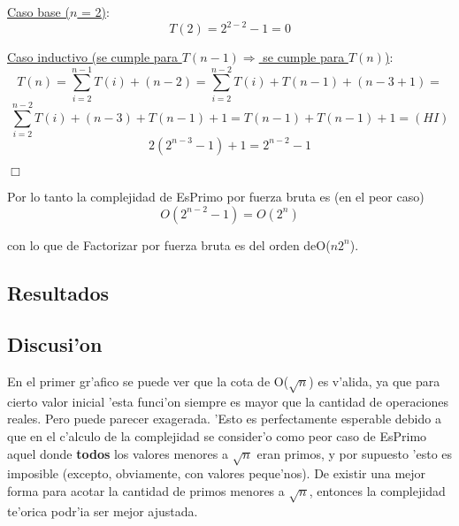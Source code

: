 \underline{Caso base ($n$ = 2)}:
$$T(2) = 2^{2-2} - 1 = 0$$

\underline{Caso inductivo (se cumple para $T(n-1) \Longrightarrow$ se cumple para $T(n)$)}:
$$T(n) = \sum_{i=2}^{n-1}{T(i)} + (n-2) = \sum_{i=2}^{n-2}{T(i)} + T(n-1) + (n-3+1) =$$
$$\sum_{i=2}^{n-2}{T(i)} + (n-3) + T(n-1) + 1 = T(n-1) + T(n-1) + 1 =  (HI)$$
$$2(2^{n-3} - 1) + 1 = 2^{n-2} - 1 $$
\begin{flushright}
$\Box$   
\end{flushright}

Por lo tanto la complejidad de EsPrimo por fuerza bruta es (en el peor caso)
$$O(2^{n-2}-1) = O(2^n)$$

con lo que de Factorizar por fuerza bruta es del orden deO($n2^n$).



\clearpage
\subsection{Resultados}
\clearpage


\subsection{Discusi'on}
En el primer gr'afico se puede ver que la cota de O($\sqrt{n}$) es v'alida, ya que para cierto valor inicial 'esta funci'on siempre es mayor que la cantidad de operaciones reales. Pero puede parecer exagerada. 'Esto es perfectamente esperable debido a que en el c'alculo de la complejidad se consider'o como peor caso de EsPrimo aquel donde {\bf todos} los valores menores a $\sqrt{n}$ eran primos, y por supuesto 'esto es imposible (excepto, obviamente, con valores peque'nos). De existir una mejor forma para acotar la cantidad de primos menores a $\sqrt{n}$, entonces la complejidad te'orica podr'ia ser mejor ajustada.


